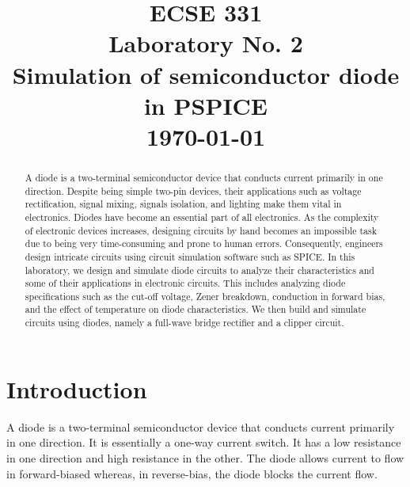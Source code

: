 \documentclass[conference]{IEEEtran}
\begin{document}
\title{ECSE 331\\
    Laboratory No. 2\\
    Simulation of semiconductor diode in PSPICE\\
    \Large \today\\
}

\author
{

    \and

}
\maketitle
\clearpage

\begin{abstract}
    A diode is a two-terminal semiconductor device that conducts current primarily in one direction. Despite being simple two-pin devices, their applications such as voltage rectification, signal mixing, signals isolation, and lighting make them vital in electronics. Diodes have become an essential part of all electronics. As the complexity of electronic devices increases, designing circuits by hand becomes an impossible task due to being very time-consuming and prone to human errors. Consequently, engineers design intricate circuits using circuit simulation software such as SPICE. In this laboratory, we design and simulate diode circuits to analyze their characteristics and some of their applications in electronic circuits. This includes analyzing diode specifications such as the cut-off voltage, Zener breakdown, conduction in forward bias, and the effect of temperature on diode characteristics. We then build and simulate circuits using diodes, namely a full-wave bridge rectifier and a clipper circuit.
\end{abstract}

\section{Introduction}
A diode is a two-terminal semiconductor device that conducts current primarily in one direction. It is essentially a one-way current switch. It has a low resistance in one direction and high resistance in the other. The diode allows current to flow in forward-biased whereas, in reverse-bias, the diode blocks the current flow.
\end{document}
